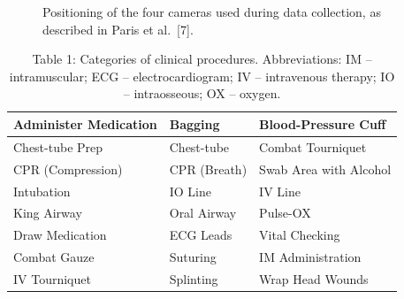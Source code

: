 \documentclass[letterpaper, 10 pt, conference]{ieeeconf}  %
\begin{document}
\begin{figure}[!htb]
        \caption{\label{fig: camera positions} Positioning of the four cameras used during data collection, as described in Paris et al.~[7]. }
      \end{figure}
      
\begin{table}[!htb]
\begin{center}
 \begin{tabular}{||l l l||} 
 \hline
Administer Medication & Bagging & Blood-Pressure Cuff  \\ [0.5ex] 
 \hline
Chest-tube Prep & Chest-tube & Combat Tourniquet  \\ 
 \hline
CPR (Compression) & CPR (Breath) & Swab Area with Alcohol  \\ 
 \hline
Intubation & IO Line & IV Line  \\ 
 \hline
King Airway & Oral Airway & Pulse-OX  \\
\hline
Draw Medication & ECG Leads & Vital Checking  \\
\hline
Combat Gauze& Suturing& IM Administration \\
\hline
 IV Tourniquet & Splinting & Wrap Head Wounds \\
\hline

\end{tabular}
\caption{Table 1: Categories of clinical procedures. Abbreviations: IM -- intramuscular; ECG -- electrocardiogram; IV -- intravenous therapy; IO -- intraosseous; OX -- oxygen.}
\end{center}
\end{table}
\end{document}

